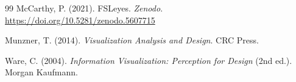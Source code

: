 \documentclass[11pt,letterpaper]{article}
\begin{document}
\begin{thebibliography}{99}
McCarthy, P. (2021).
FSLeyes.
\textit{Zenodo}. \url{https://doi.org/10.5281/zenodo.5607715}

Munzner, T. (2014).
\textit{Visualization Analysis and Design}.
CRC Press.

Ware, C. (2004).
\textit{Information Visualization: Perception for Design} (2nd ed.).
Morgan Kaufmann.

\end{thebibliography}
\end{document}

